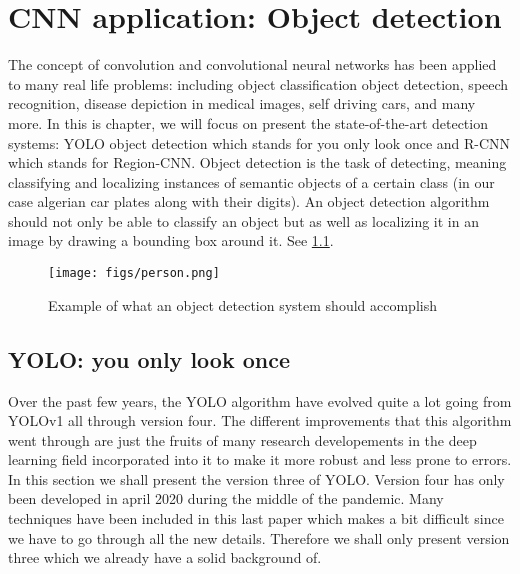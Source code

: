 \chapter{CNN application: Object detection}
The concept of convolution and convolutional neural networks has been applied to many real life problems: including object classification
object detection, speech recognition, disease depiction in medical images, self driving cars, and many more.
In this is chapter, we will focus on present the state-of-the-art detection systems: YOLO object detection which stands for you only look once
and R-CNN which stands for Region-CNN.
Object detection is the task of detecting, meaning classifying and localizing instances of semantic objects of a certain class (in our
case algerian car plates along with their digits). An object detection algorithm should not only be able to classify an object but as well as
localizing it in an image by drawing a bounding box around it. See \cref{fig:detection}.

\begin{figure}[!htbp]
  \centering
  \texttt{[image: figs/person.png]}
  \caption{Example of what an object detection system should accomplish}\label{fig:detection}
\end{figure}

\section{YOLO: you only look once}
Over the past few years, the YOLO algorithm have evolved quite a lot going from YOLOv1 all through version four. The different
improvements that this algorithm went through are just the fruits of many research developements in the deep learning field incorporated into it to
make it more robust and less prone to errors. In this section we shall present the version three of YOLO. Version four has only been developed in
april 2020 during the middle of the pandemic. Many techniques have been included in this last paper which makes a bit difficult since we have to go
through all the new details. Therefore we shall only present version three which we already have a solid background of.

